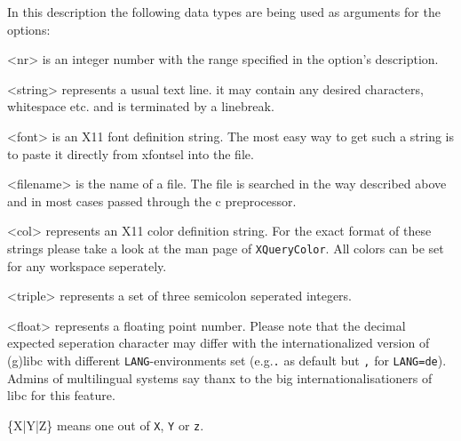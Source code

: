 \documentclass[10pt,a4paper]{article}
\newenvironment{ttdesc}[1]{
   \begin{list}{}{
          \renewcommand{\makelabel}[1]{\texttt{##1\hfill}}}}{\end{list}}
\begin{document}
In this description the following data types are being used as arguments for the options:
\begin{ttdesc}{description}
\item[<nr>] is an integer number with the range specified in the option's description.
\item[<string>] represents a usual text line. it may contain any desired characters, whitespace etc. and is terminated by a linebreak.
\item[<font>] is an X11 font definition string. The most easy way to get such a string is to paste it directly from xfontsel into the file.
\item[<filename>] is the name of a file. The file is searched in the way described above and in most cases passed through the c preprocessor.
\item[<col>] represents an X11 color definition string. For the exact format of these strings please take a look at the man page of \texttt{XQueryColor}. All colors can be set for any workspace seperately.
\item[<triple>] represents a set of three semicolon seperated integers.
\item[<float>] represents a floating point number. Please note that the decimal expected seperation character may differ with the internationalized version of (g)libc with different \texttt{LANG}-environments set (e.g.\texttt{.} as default but \texttt{,} for \texttt{LANG=de}). Admins of multilingual systems say thanx to the big internationalisationers of libc for this feature.
\item[\{X|Y|Z\}] means one out of \texttt{X}, \texttt{Y} or \texttt{z}.
\end{ttdesc}
\end{document}
